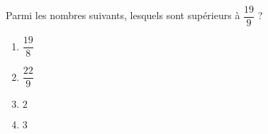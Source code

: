 
\begin{exercice}\label{exo2smath-0022}

    Parmi les nombres suivants, lesquels sont supérieurs à \( \dfrac{ 19 }{ 9 }\) ?
    \begin{multicols}{4}
        \begin{enumerate}
            \item
                \( \dfrac{ 19 }{ 8 }\)
            \item
                \( \dfrac{ 22 }{ 9 }\)
            \item
                \( 2\)
            \item
                \( 3\)
        \end{enumerate}
    \end{multicols}

\end{exercice}
